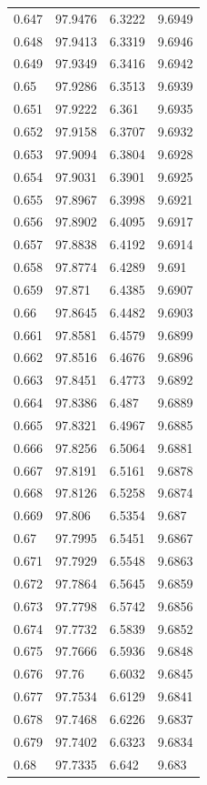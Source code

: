 \begin{tabular}{llll}
0.647 & 97.9476 & 6.3222 & 9.6949 \\
0.648 & 97.9413 & 6.3319 & 9.6946 \\
0.649 & 97.9349 & 6.3416 & 9.6942 \\
0.65 & 97.9286 & 6.3513 & 9.6939 \\
0.651 & 97.9222 & 6.361 & 9.6935 \\
0.652 & 97.9158 & 6.3707 & 9.6932 \\
0.653 & 97.9094 & 6.3804 & 9.6928 \\
0.654 & 97.9031 & 6.3901 & 9.6925 \\
0.655 & 97.8967 & 6.3998 & 9.6921 \\
0.656 & 97.8902 & 6.4095 & 9.6917 \\
0.657 & 97.8838 & 6.4192 & 9.6914 \\
0.658 & 97.8774 & 6.4289 & 9.691 \\
0.659 & 97.871 & 6.4385 & 9.6907 \\
0.66 & 97.8645 & 6.4482 & 9.6903 \\
0.661 & 97.8581 & 6.4579 & 9.6899 \\
0.662 & 97.8516 & 6.4676 & 9.6896 \\
0.663 & 97.8451 & 6.4773 & 9.6892 \\
0.664 & 97.8386 & 6.487 & 9.6889 \\
0.665 & 97.8321 & 6.4967 & 9.6885 \\
0.666 & 97.8256 & 6.5064 & 9.6881 \\
0.667 & 97.8191 & 6.5161 & 9.6878 \\
0.668 & 97.8126 & 6.5258 & 9.6874 \\
0.669 & 97.806 & 6.5354 & 9.687 \\
0.67 & 97.7995 & 6.5451 & 9.6867 \\
0.671 & 97.7929 & 6.5548 & 9.6863 \\
0.672 & 97.7864 & 6.5645 & 9.6859 \\
0.673 & 97.7798 & 6.5742 & 9.6856 \\
0.674 & 97.7732 & 6.5839 & 9.6852 \\
0.675 & 97.7666 & 6.5936 & 9.6848 \\
0.676 & 97.76 & 6.6032 & 9.6845 \\
0.677 & 97.7534 & 6.6129 & 9.6841 \\
0.678 & 97.7468 & 6.6226 & 9.6837 \\
0.679 & 97.7402 & 6.6323 & 9.6834 \\
0.68 & 97.7335 & 6.642 & 9.683 \\

\end{tabular}
